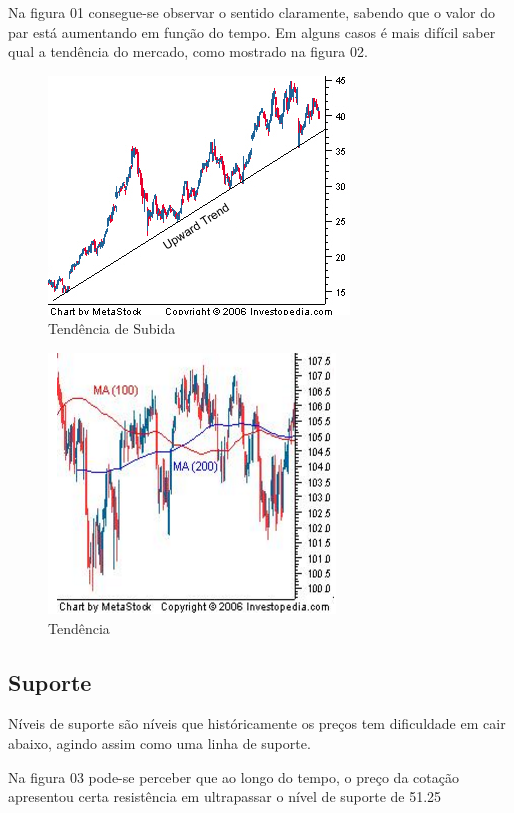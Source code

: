 Na figura 01 consegue-se observar o sentido claramente, sabendo que o valor do par está aumentando em função do tempo.
Em alguns casos é mais difícil saber qual a tendência do mercado, como mostrado na figura 02.

\begin{figure}[h]
	\centering
	\includegraphics[keepaspectratio=true,scale=1]{figuras/up.png}
	\caption{Tendência de Subida \cite{investopedia}}
	\label{fig01}
\end{figure}

\begin{figure}[h]
	\centering
	\includegraphics[keepaspectratio=true,scale=1]{figuras/flat.png}
	\caption{Tendência \cite{investopedia}}
	\label{fig02}
\end{figure}


\subsection{Suporte}

Níveis de suporte são níveis que históricamente os preços tem dificuldade em cair abaixo, agindo assim como uma linha de suporte.\cite{allen}

Na figura 03 pode-se perceber que ao longo do tempo, o preço da cotação apresentou certa resistência em ultrapassar o nível de suporte de 51.25

